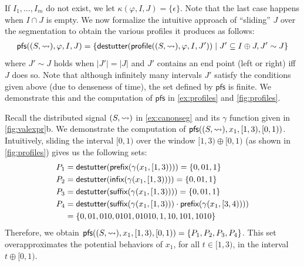 If $I_1, \ldots, I_m$ do not exist, we let $\kappa(\varphi, I, J) = \{\epsilon\}$.
Note that the last case happens when $I \cap J$ is empty.
We now formalize the intuitive approach of ``sliding'' $J$ over the segmentation to obtain the 
various profiles it produces as follows:
%
\small
\begin{align*}
	\mathsf{pfs}((S,{\hb}), \varphi, I, J) = \{\destutter(\mathsf{profile}((S,{\hb}), \varphi, I, J')) \st J' \subseteq I \oplus J, J' \sim J\}
\end{align*}
\normalsize
where $J' \sim J$ holds when $|J'| = |J|$ and $J'$ contains an end point (left or right) iff $J$ does so.
Note that although infinitely many intervals $J'$ satisfy the conditions given above (due to denseness of time), the set defined by $\mathsf{pfs}$ is finite.
We demonstrate this and the computation of $\mathsf{pfs}$ in \cref{ex:profiles} and \cref{fig:profiles}.

\begin{example} \label{ex:profiles}
	Recall the distributed signal $(S, {\rightsquigarrow})$ in \cref{ex:canonseg} and its $\gamma$ function given in \cref{fig:valexpr}b.
	We demonstrate the computation of $\mathsf{pfs}((S,{\rightsquigarrow}), x_1, [1,3), [0,1))$.
	Intuitively, sliding the interval $[0,1)$ over the window $[1,3) \oplus [0,1)$ (as shown in \cref{fig:profiles}) gives us the following sets:
	\begin{align*}
		P_1 &= \mathsf{destutter}(\textsf{prefix}(\gamma(x_1, [1,3)))) = \{ 0, 01, 1 \}\\
		P_2 &= \mathsf{destutter}(\textsf{infix}(\gamma(x_1, [1,3)))) = \{ 0, 01, 1 \} \\
		P_3 &= \mathsf{destutter}(\textsf{suffix}(\gamma(x_1, [1,3)))) = \{ 0, 01, 1 \} \\
		P_4 &= \mathsf{destutter}(\textsf{suffix}(\gamma(x_1, [1,3))) \cdot \textsf{prefix}(\gamma(x_1, [3,4)))) \\
		&= \{ 0, 01, 010, 0101, 01010, 1, 10, 101, 1010 \}
	\end{align*}
	Therefore, we obtain $\mathsf{pfs}((S,{\rightsquigarrow}), x_1, [1,3), [0,1)) = \{P_1, P_2, P_3, P_4\}$.
	This set overapproximates the potential behaviors of $x_1$, for all $t \in [1,3)$, in the interval $t \oplus [0,1)$.
\end{example}

